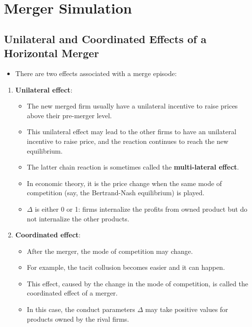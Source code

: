 \documentclass[
]{book}
\providecommand{\tightlist}{%
  \setlength{\itemsep}{0pt}\setlength{\parskip}{0pt}}
\begin{document}
\hypertarget{merger-simulation}{%
\section{Merger Simulation}\label{merger-simulation}}

\hypertarget{unilateral-and-coordinated-effects-of-a-horizontal-merger}{%
\subsection{Unilateral and Coordinated Effects of a Horizontal Merger}\label{unilateral-and-coordinated-effects-of-a-horizontal-merger}}

\begin{itemize}
\tightlist
\item
  There are two effects associated with a merge episode:
\end{itemize}

\begin{enumerate}
\def\labelenumi{\arabic{enumi}.}
\tightlist
\item
  \textbf{Unilateral effect}:

  \begin{itemize}
  \tightlist
  \item
    The new merged firm usually have a unilateral incentive to raise prices above their pre-merger level.
  \item
    This unilateral effect may lead to the other firms to have an unilateral incentive to raise price, and the reaction continues to reach the new equilibrium.
  \item
    The latter chain reaction is sometimes called the \textbf{multi-lateral effect}.
  \item
    In economic theory, it is the price change when the same mode of competition (say, the Bertrand-Nash equilibrium) is played.
  \item
    \(\Delta\) is either 0 or 1: firms internalize the profits from owned product but do not internalize the other products.
  \end{itemize}
\item
  \textbf{Coordinated effect}:

  \begin{itemize}
  \tightlist
  \item
    After the merger, the mode of competition may change.
  \item
    For example, the tacit collusion becomes easier and it can happen.
  \item
    This effect, caused by the change in the mode of competition, is called the coordinated effect of a merger.
  \item
    In this case, the conduct parameters \(\Delta\) may take positive values for products owned by the rival firms.
  \end{itemize}
\end{enumerate}
\end{document}

